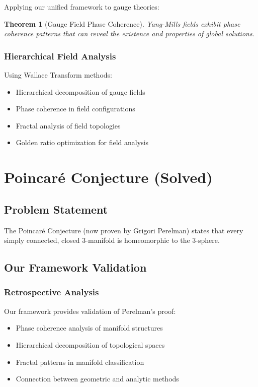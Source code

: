 \documentclass[12pt]{article}
\newtheorem{theorem}{Theorem}
\begin{document}
Applying our unified framework to gauge theories:

\begin{theorem}[Gauge Field Phase Coherence]
Yang-Mills fields exhibit phase coherence patterns that can reveal the existence and properties of global solutions.
\end{theorem}

\subsubsection{Hierarchical Field Analysis}

Using Wallace Transform methods:
\begin{itemize}
    \item Hierarchical decomposition of gauge fields
    \item Phase coherence in field configurations
    \item Fractal analysis of field topologies
    \item Golden ratio optimization for field analysis
\end{itemize}

\section{Poincaré Conjecture (Solved)}

\subsection{Problem Statement}
The Poincaré Conjecture (now proven by Grigori Perelman) states that every simply connected, closed 3-manifold is homeomorphic to the 3-sphere.

\subsection{Our Framework Validation}

\subsubsection{Retrospective Analysis}

Our framework provides validation of Perelman's proof:
\begin{itemize}
    \item Phase coherence analysis of manifold structures
    \item Hierarchical decomposition of topological spaces
    \item Fractal patterns in manifold classification
    \item Connection between geometric and analytic methods
\end{itemize}
\end{document}
